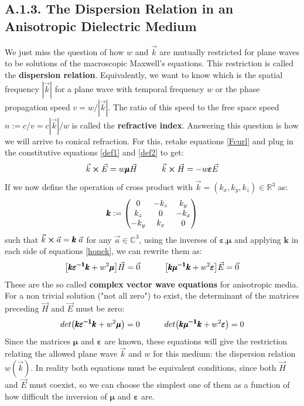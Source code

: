 \documentclass[11pt, a4paper, twoside]{article} %
\newcommand{\R}{\mathbb{R}} %
\newcommand{\C}{\mathbb{C}}
\begin{document}
\subsection*{A.1.3. The Dispersion Relation in an Anisotropic Dielectric Medium\vspace{-0.2cm}}
We just miss the question of how $w$ and $\vec{k}$ are mutually restricted for plane waves to be solutions of the macroscopic Maxwell's equations. This restriction is called the {\bf dispersion relation}. Equivalently, we want to know which is the spatial frequency $|\vec{k}|$ for a plane wave with temporal frequency $w$ or the phase propagation speed $v=w/|\vec{k}|$. The ratio of this speed to the free space speed $n:=c/v=c|\vec{k}|/w$ is called the {\bf refractive index}. Answering this question is how we will arrive to conical refraction. For this, retake equations \eqref{Fcurl} and plug in the constitutive equations \eqref{def1} and \eqref{def2} to get:
\begin{equation}\label{honek}
\vec{k}\cross \vec{E}=w\pmb{\mu}\vec{H} \quad \quad \quad \vec{k}\cross\vec{H}=-w\pmb{\varepsilon}\vec{E}
\end{equation} 
If we now define the operation of cross product with $\vec{k}=(k_x,k_y,k_z)\in\R^3$ as:\vspace{-0.1cm}
\begin{equation}
\pmb{k}:=\begin{pmatrix}
0& -k_z& k_y\\
k_z & 0 & -k_x\\
-k_y & k_x & 0
\end{pmatrix}\vspace{-0.1cm}
\end{equation}
such that $\vec{k}\cross\vec{a}=\pmb{k}\;\vec{a}$ for any $\vec{a}\in\C^3$, using the inverses of $\pmb{\varepsilon}$,$\pmb{\mu}$ and applying $\pmb{k}$ in each side of equations \eqref{honek}, we can rewrite them as:\vspace{-0.1cm}
\begin{equation}
\qty[\pmb{k}\pmb{\varepsilon^{-1}}\pmb{k}+w^2\pmb{\mu}]\vec{H}=\vec{0} \quad \quad \quad \qty[\pmb{k}\pmb{\mu^{-1}}\pmb{k}+w^2\pmb{\varepsilon}]\vec{E}=\vec{0}
\end{equation}
These are the so called {\bf complex vector wave equations} for anisotropic media. For a non trivial solution ("not all zero") to exist, the determinant of the matrices preceding $\vec{H}$ and $\vec{E}$ must be zero:
\begin{equation}\label{wave2}
det\qty(\pmb{k}\pmb{\varepsilon^{-1}}\pmb{k}+w^2\pmb{\mu})=0 \quad \quad\quad det\qty(\pmb{k}\pmb{\mu^{-1}}\pmb{k}+w^2\pmb{\varepsilon})=0
\end{equation}
Since the matrices $\pmb{\mu}$ and $\pmb{\varepsilon}$ are known, these equations will give the restriction relating the allowed plane wave $\vec{k}$ and $w$ for this medium: the dispersion relation $w(\vec{k})$. In reality both equations must be equivalent conditions, since both $\vec{H}$ and $\vec{E}$ must coexist, so we can choose the simplest one of them as a function of how difficult the inversion of $\pmb{\mu}$ and $\pmb{\varepsilon}$ are.
\end{document}
